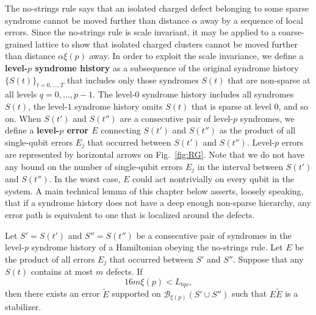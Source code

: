 The no-strings rule says that an isolated charged defect belonging to some sparse syndrome
cannot be moved further than distance $\alpha$ away by a sequence of local errors.
Since the no-strings rule is scale invariant,
it may be applied to a coarse-grained lattice to show that isolated
charged clusters cannot be moved further than distance $\alpha \xi(p)$ away.
In order to exploit the scale invariance,
we define a {\bf level-$p$ syndrome history}
as a subsequence of the original syndrome history $\{S(t)\}_{t=0,\ldots,T}$
that includes only those syndromes $S(t)$ that are non-sparse
at all levels $q=0,\ldots,p-1$.
The level-$0$ syndrome history includes all syndromes $S(t)$,
the level-$1$ syndrome history omits $S(t)$ that is sparse at level 0,
and so on.
When $S(t')$ and $S(t'')$ are a consecutive pair of level-$p$ syndromes,
we define a {\bf level-$p$ error $E$} connecting $S(t')$ and $S(t'')$
as the product of all single-qubit errors $E_j$ that occurred between $S(t')$ and $S(t'')$.
Level-$p$ errors are represented by horizontal arrows on Fig.~\ref{fig:RG}.
Note that we do not have any bound on the number
of single-qubit errors $E_j$ in the interval between $S(t')$ and $S(t'')$.
In the worst case, $E$ could act nontrivially on every qubit in the system.
%
A main technical lemma of this chapter below asserts, loosely speaking, that
if a syndrome history does not have a deep enough non-sparse hierarchy,
any error path is equivalent to one that is localized around the defects.


\begin{lem}
\label{lemma:RG2}
Let $S'= S(t')$ and $S''= S(t'')$ be a consecutive pair of syndromes in the level-$p$ syndrome history
of a Hamiltonian obeying the no-strings rule.
Let $E$ be the product of all errors $E_j$ that occurred between $S'$ and $S''$.
Suppose that any $S(t)$ contains at most $m$ defects.
If 
\[
16 m \xi(p) < L_{tqo},
\]
then there exists an error $\tilde{E}$  supported on $\mathcal B _{\xi(p)}(S'\cup S'')$
such that $E\tilde{E}$ is a stabilizer.
\end{lem}

